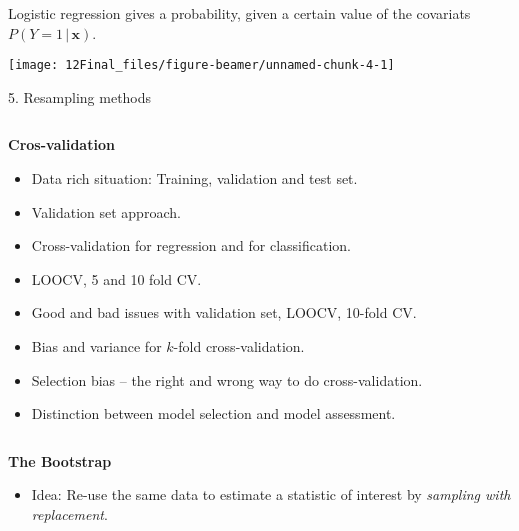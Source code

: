 \documentclass[10pt,ignorenonframetext,]{beamer}
\providecommand{\tightlist}{%
  \setlength{\itemsep}{0pt}\setlength{\parskip}{0pt}}
\begin{document}
\begin{frame}

Logistic regression gives a probability, given a certain value of the
covariats \(P(Y=1 \, | \, \boldsymbol{x})\).

\texttt{[image: 12Final\_files/figure-beamer/unnamed-chunk-4-1]}

\end{frame}

\begin{frame}

\begin{block}{5. Resampling methods}

\(~\)

\textbf{Cros-validation}

\vspace{2mm}

\begin{itemize}
\item
  Data rich situation: Training, validation and test set. \vspace{2mm}
\item
  Validation set approach. \vspace{2mm}
\item
  Cross-validation for regression and for classification. \vspace{2mm}
\item
  LOOCV, 5 and 10 fold CV. \vspace{2mm}
\item
  Good and bad issues with validation set, LOOCV, 10-fold CV.
  \vspace{2mm}
\item
  Bias and variance for \(k\)-fold cross-validation. \vspace{2mm}
\item
  Selection bias -- the right and wrong way to do cross-validation.
  \vspace{2mm}
\item
  Distinction between model selection and model assessment.
\end{itemize}

\(~\)

\textbf{The Bootstrap}

\begin{itemize}
\tightlist
\item
  Idea: Re-use the same data to estimate a statistic of interest by
  \emph{sampling with replacement}.
\end{itemize}

\end{block}

\end{frame}
\end{document}
